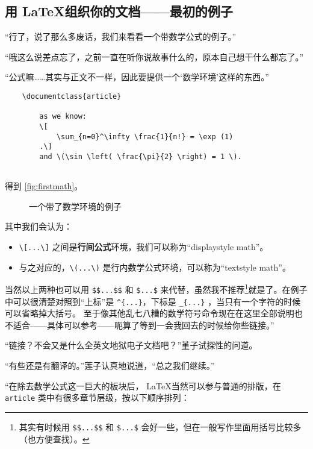 \subsection{用 \LaTeX 组织你的文档——最初的例子}

“行了，说了那么多废话，我们来看看一个带数学公式的例子。”

“哦这么说差点忘了，之前一直在听你说故事什么的，原本自己想干什么都忘了。”

“公式嘛……其实与正文不一样，因此要提供一个‘数学环境’这样的东西。”

\begin{codeing}
    \begin{lstlisting}
    \documentclass{article}
    
        as we know:
        \[
            \sum_{n=0}^\infty \frac{1}{n!} = \exp (1)
        .\]
        and \(\sin \left( \frac{\pi}{2} \right) = 1 \).
    
\end{lstlisting}
\end{codeing}

得到 \autoref{fig:firstmath}。

\begin{figure}[th]
    \centering
    \caption{一个带了数学环境的例子}
    \label{fig:firstmath}
\end{figure}


其中我们会认为：
\begin{itemize}
    \item \verb"\[...\]" 之间是\textbf{行间公式}环境，我们可以称为``displaystyle math''。
    \item 与之对应的，\verb"\(...\)" 是行内数学公式环境，可以称为``textstyle math''。
\end{itemize}

当然以上两种也可以用 \verb"$$...$$" 和 \verb"$...$" 来代替，虽然我不推荐\footnote{其实有时候用 \texttt{\$\$...\$\$} 和 \texttt{\$...\$} 会好一些，但在一般写作里面用括号比较多（也方便查找）。}就是了。在例子中可以很清楚对照到“上标”是 \verb"^{...}"，下标是 \verb"_{...}" ，当只有一个字符的时候可以省略掉大括号。 至于像其他乱七八糟的数学符号命令现在在这里全部说明也不适合——具体可以参考——呃算了等到一会我回去的时候给你些链接。”

“链接？不会又是什么全英文地狱电子文档吧？”堇子试探性的问道。

“有些还是有翻译的。”莲子认真地说道，“总之我们继续。”

“在除去数学公式这一巨大的板块后， \LaTeX 当然可以参与普通的排版，在 \verb"article" 类中有很多章节层级，按以下顺序排列：

